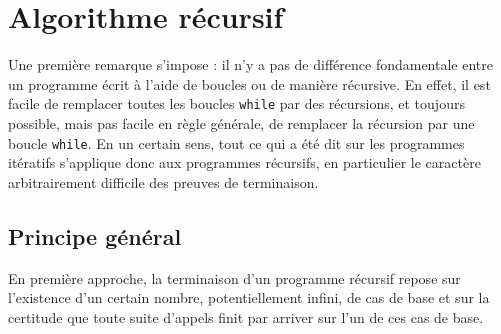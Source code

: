 \documentclass{magnolia}
\begin{document}
\section{Algorithme récursif}

Une première remarque s'impose : il n'y a pas de différence fondamentale
entre un programme écrit à l'aide de boucles ou de manière récursive.
En effet, il est facile de remplacer toutes les boucles \verb!while!
par des récursions, et toujours possible, mais pas facile en règle
générale,
de remplacer la récursion par une boucle \verb!while!. En un
certain sens, tout ce qui a été dit sur les programmes itératifs
s'applique donc aux programmes récursifs, en particulier le caractère
arbitrairement difficile des preuves de terminaison.

\subsection{Principe général}

En première approche, la terminaison d'un programme récursif repose sur
l'existence d'un certain nombre, potentiellement infini, de cas de base
et sur la certitude que toute suite d'appels finit par arriver sur l'un
de ces cas de base.\\
\end{document}
